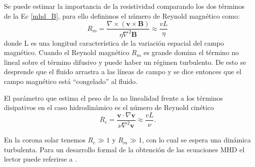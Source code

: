 \documentclass[a4paper,11pt]{report}
\begin{document}

Se puede estimar la importancia de la resistividad comparando los dos términos de la Ec \ref{mhd_B}, para ello definimos el número de Reynold magnético como:
\begin{equation}
R_m = \frac{\nabla \times (\boldsymbol{v} \times \boldsymbol{B}) }{\eta \nabla^2 \boldsymbol{B}} \approx \frac{vL}{\eta}\label{reynold}
\end{equation}
 donde L es una longitud característica de la variación espacial del campo magnético. Cuando el Reynold magnético $R_m$ es grande domina el término no lineal sobre el término difusivo y puede haber un régimen turbulento. De esto se desprende que el fluido arrastra a las líneas de campo y se dice entonces que el campo magnético está ``congelado'' al fluido. 
 
El parámetro que estima el peso de la no linealidad frente a los términos disipativos en el caso hidrodinámico es el número de Reynold cinético
\begin{equation}
R_e = \frac{ \boldsymbol{v}\cdot \nabla \boldsymbol{v}}{\nu \nabla^2 \boldsymbol{v}} \approx \frac{vL}{\nu}\label{reynold_c}.
\end{equation}

En la corona solar tenemos $R_e \gg 1$ y $R_m \gg 1$, con lo cual se espera una dinámica turbulenta. Para un desarrollo formal de la obtención de las ecuaciones MHD el lector puede referirse a \citet{braginskii_1965}. 
\end{document}
